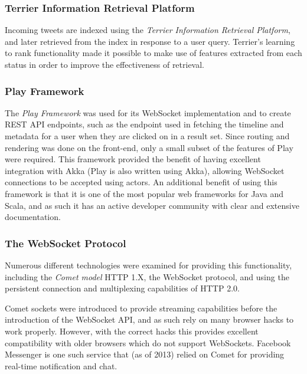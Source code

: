 \documentclass{l4proj}
\begin{document}
        \subsubsection{Terrier Information Retrieval Platform}
        Incoming tweets are indexed using the \textit{Terrier Information Retrieval Platform}, and later retrieved from the index in response to a user query. Terrier's learning to rank functionality made it possible to make use of features extracted from each status in order to improve the effectiveness of retrieval.
        
        
        \subsubsection{Play Framework}
        The \textit{Play Framework} was used for its WebSocket implementation and to create REST API endpoints, such as the endpoint used in fetching the timeline and metadata for a user when they are clicked on in a result set. Since routing and rendering was done on the front-end, only a small subset of the features of Play were required. This framework provided the benefit of having excellent integration with Akka (Play is also written using Akka), allowing WebSocket connections to be accepted using actors. An additional benefit of using this framework is that it is one of the most popular web frameworks for Java and Scala, and as such it has an active developer community with clear and extensive documentation.
        
        \subsubsection{The WebSocket Protocol}
        Numerous different technologies were examined for providing this functionality, including the \textit{Comet model} HTTP 1.X, the WebSocket protocol, and using the persistent connection and multiplexing capabilities of HTTP 2.0.
        
        Comet sockets were introduced to provide streaming capabilities before the introduction of the WebSocket API, and as such rely on many browser hacks to work properly. However, with the correct hacks this provides excellent compatibility with older browsers which do not support WebSockets. Facebook Messenger is one such service that (as of 2013) relied on Comet for providing real-time notification and chat.
        
\end{document}

